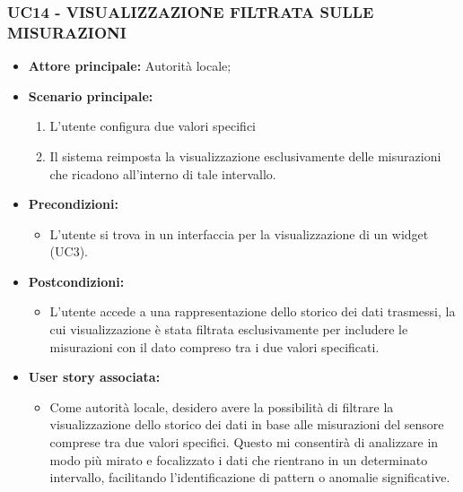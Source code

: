 \subsubsection{UC14 - VISUALIZZAZIONE FILTRATA SULLE MISURAZIONI}
\begin{itemize}
    \item \textbf{Attore principale:} Autorità locale;
    \item \textbf{Scenario principale:}
          \begin{enumerate}
              \item L'utente configura due valori specifici 
              \item Il sistema reimposta la visualizzazione esclusivamente delle misurazioni che ricadono all'interno di tale intervallo.
          \end{enumerate}
    \item \textbf{Precondizioni:}
          \begin{itemize}
              \item  L'utente si trova in un interfaccia per la visualizzazione di un widget (UC3).
          \end{itemize}
    \item \textbf{Postcondizioni:}
          \begin{itemize}
              \item  L'utente accede a una rappresentazione dello storico dei dati trasmessi, la cui visualizzazione è stata filtrata esclusivamente per includere le misurazioni con il dato compreso tra i due valori specificati.
          \end{itemize}
    \item \textbf{User story associata:}
          \begin{itemize}
            \item Come autorità locale, desidero avere la possibilità di filtrare la visualizzazione dello storico dei dati in base alle misurazioni del sensore comprese tra due valori specifici. Questo mi consentirà di analizzare in modo più mirato e focalizzato i dati che rientrano in un determinato intervallo, facilitando l'identificazione di pattern o anomalie significative.
          \end{itemize}
\end{itemize}
